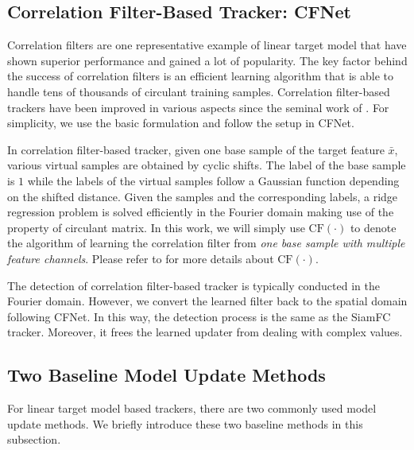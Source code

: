 \documentclass[journal]{IEEEtran}
\begin{document}
\subsection{Correlation Filter-Based Tracker: CFNet}
Correlation filters are one representative example of linear target model that have shown superior performance and gained a lot of popularity. The key factor behind the success of correlation filters is an efficient learning algorithm that is able to handle tens of thousands of circulant training samples. Correlation filter-based trackers have been improved in various aspects since the seminal work of \cite{bolme2010visual}. For simplicity, we use the basic formulation and follow the setup in CFNet\cite{valmadre2017end}.

In correlation filter-based tracker, given one base sample of the target feature $\bar{x}$, various virtual samples are obtained by cyclic shifts. The label of the base sample is $1$ while the labels of the virtual samples follow a Gaussian function depending on the shifted distance. Given the samples and the corresponding labels, a ridge regression problem is solved efficiently in the Fourier domain making use of the property of circulant matrix\cite{gray2006toeplitz}. In this work, we will simply use $\mathrm{CF}(\cdot)$ to denote the algorithm of learning the correlation filter from \emph{one base sample with multiple feature channels}. Please refer to \cite{bolme2010visual, henriques2015high} for more details about $\mathrm{CF}(\cdot)$.

The detection of correlation filter-based tracker is typically conducted in the Fourier domain. However, we convert the learned filter back to the spatial domain following CFNet. In this way, the detection process is the same as the SiamFC tracker. Moreover, it frees the learned updater from dealing with complex values.

\subsection{Two Baseline Model Update Methods}
For linear target model based trackers, there are two commonly used model update methods. We briefly introduce these two baseline methods in this subsection.  
\end{document}
